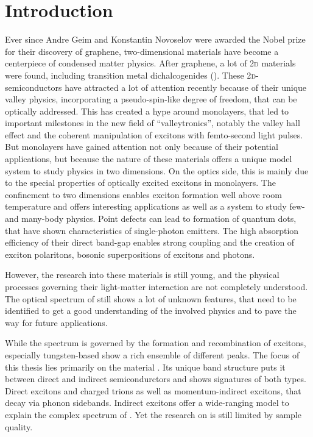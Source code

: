 \chapter{Introduction}
Ever since Andre Geim and Konstantin Novoselov were awarded the Nobel prize for their discovery of graphene, two-dimensional materials have become a centerpiece of condensed matter physics\cite{novoselov_electric_2004}. After graphene, a lot of 2\textsc{d} materials were found, including transition metal dichalcogenides (\tmds\!). These 2\textsc{d}-semiconductors have attracted a lot of attention recently because of their unique valley physics, incorporating a pseudo-spin-like degree of freedom, that can be optically addressed\cite{wang_electronics_2012}. This has created a hype around \tmdg monolayers, that led to important milestones in the new field of ``valleytronics'', notably the valley hall effect\cite{mak_valley_2014} and the coherent manipulation of excitons with femto-second light pulses\cite{langer_lightwave_2018}. But \tmdg monolayers have gained attention not only because of their potential applications, but because the nature of these materials offers a unique model system to study physics in two dimensions. On the optics side, this is mainly due to the special properties of optically excited excitons in \tmdg monolayers. The confinement to two dimensions enables exciton formation well above room temperature and offers interesting applications as well as a system to study few- and many-body physics\cite{chernikov_exciton_2014}. Point defects can lead to formation of quantum dots, that have shown characteristics of single-photon emitters\cite{srivastava_optically_2015}. The high absorption efficiency of their direct band-gap enables strong coupling and the creation of exciton polaritons, bosonic superpositions of excitons and photons\cite{liu_control_2017,zhang_photonic-crystal_2018}.

However, the research into these materials is still young, and the physical processes governing their light-matter interaction are not completely understood\cite{koperski_optical_2017}. The optical spectrum of \tmds still shows a lot of unknown features, that need to be identified to get a good understanding of the involved physics and to pave the way for future applications. 

While the spectrum is governed by the formation and recombination of excitons, especially tungsten-based \tmds show a rich ensemble of different peaks. The focus of this thesis lies primarily on the material \wse\!. Its unique band structure puts it between direct and indirect semicondurctors and shows signatures of both types. Direct excitons and charged trions as well as momentum-indirect excitons, that decay via phonon sidebands. Indirect excitons offer a wide-ranging model to explain the complex spectrum of \wse\!. Yet the research on \tmds is still limited by sample quality. 

